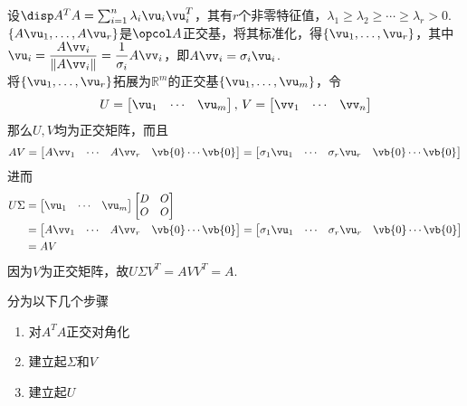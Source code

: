 \begin{analysis}
设$\disp A^TA=\sum_{i=1}^n\lambda_i\vu_i\vu_i^T$，其有$r$个非零特征值，$\lambda_1\geq\lambda_2\geq\cdots\geq\lambda_r>0$.\\
$\{A\vu_1,\dots,A\vu_r\}$是$\opcol A$正交基，将其标准化，得$\{\vu_1,\dots,\vu_r\}$，其中$\vu_i=\dfrac{A\vv_i}{\|A\vv_i\|}=\dfrac{1}{\sigma_i}A\vv_i$，即$A\vv_i=\sigma_i\vu_i$.\\
将$\{\vu_1,\dots,\vu_r\}$拓展为$\mathbb{R}^m$的正交基$\{\vu_1,\dots,\vu_m\}$，令
\[U=\begin{bmatrix}\vu_1&\cdots&\vu_m\end{bmatrix},\,V=\begin{bmatrix}\vv_1&\cdots&\vv_n\end{bmatrix}\]
那么$U,V$均为正交矩阵，而且
\[AV=\begin{bmatrix}A\vv_1&\cdots&A\vv_r&\vb{0}\cdots\vb{0}\end{bmatrix}=\begin{bmatrix}\sigma_1\vu_1&\cdots&\sigma_r\vu_r&\vb{0}\cdots\vb{0}\end{bmatrix}\]
进而
\[\begin{aligned}U\Sigma&=\begin{bmatrix}\vu_1&\cdots&\vu_m\end{bmatrix}\begin{bmatrix}D&O\\O&O\end{bmatrix}\\
&=\begin{bmatrix}A\vv_1&\cdots&A\vv_r&\vb{0}\cdots\vb{0}\end{bmatrix}=\begin{bmatrix}\sigma_1\vu_1&\cdots&\sigma_r\vu_r&\vb{0}\cdots\vb{0}\end{bmatrix}\\
&=AV\end{aligned}\]
因为$V$为正交矩阵，故$U\Sigma V^T=AVV^T=A$.
\end{analysis}
\begin{myalgorithm}[奇异值分解]
分为以下几个步骤
\begin{enumerate}
	\itemsep -3pt
	\item 对$A^TA$正交对角化
	\item 建立起$\Sigma$和$V$
	\item 建立起$U$
\end{enumerate}
\end{myalgorithm}


